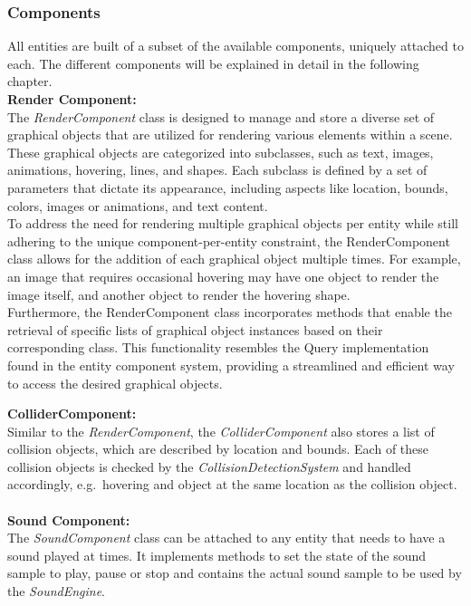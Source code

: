 \subsubsection{Components}\label{subsubsec:components}
All entities are built of a subset of the available components, uniquely attached to each.
The different components will be explained in detail in the following chapter.
\\
\textbf{Render Component:} \\
The \textit{RenderComponent} class is designed to manage and store a diverse set of graphical objects that are utilized for rendering various elements within a scene.
These graphical objects are categorized into subclasses, such as text, images, animations, hovering, lines, and shapes.
Each subclass is defined by a set of parameters that dictate its appearance, including aspects like location, bounds, colors, images or animations, and text content.
\\
To address the need for rendering multiple graphical objects per entity while still adhering to the unique component-per-entity constraint, the RenderComponent class allows for the addition of each graphical object multiple times.
For example, an image that requires occasional hovering may have one object to render the image itself, and another object to render the hovering shape.
\\
Furthermore, the RenderComponent class incorporates methods that enable the retrieval of specific lists of graphical object instances based on their corresponding class.
This functionality resembles the Query implementation found in the entity component system, providing a streamlined and efficient way to access the desired graphical objects.

\textbf{ColliderComponent:} \\
Similar to the \textit{RenderComponent}, the \textit{ColliderComponent} also stores a list of collision objects, which are described by location and bounds.
Each of these collision objects is checked by the \textit{CollisionDetectionSystem} and handled accordingly, e.g.\
hovering and object at the same location as the collision object. \\ \\

\textbf{Sound Component:} \\
The \textit{SoundComponent} class can be attached to any entity that needs to have a sound played at times.
It implements methods to set the state of the sound sample to play, pause or stop and contains the actual sound sample to be used by the \textit{SoundEngine}. \\ \\

